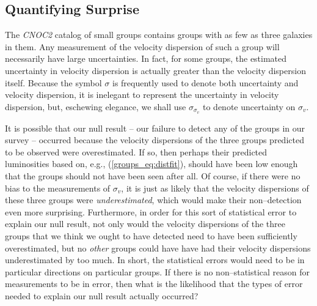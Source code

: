 \subsection{Quantifying Surprise}
\label{groups_subsec:surprise}
The \textsl{CNOC2} catalog of small groups \citep{carlberg2001gg}
contains groups with as few as three galaxies in them.  Any
measurement of the velocity dispersion of such a group will
necessarily have large uncertainties.  In fact, for some groups, the
estimated uncertainty in velocity dispersion is actually greater than
the velocity dispersion itself.  Because the symbol $\sigma$ is
frequently used to denote both uncertainty and velocity dispersion, it
is inelegant to represent the uncertainty in velocity dispersion, but,
eschewing elegance, we shall use $\sigma_{\sigma_v}$ to denote
uncertainty on $\sigma_v$.

It is possible that our null result -- our failure to detect any of
the groups in our survey -- occurred because the velocity dispersions
of the three groups predicted to be observed were overestimated.  If
so, then perhaps their predicted luminosities based on, e.g.,
(\ref{groups_eq:distfit}), should have been low enough that the groups
should not have been seen after all.  Of course, if there were no bias
to the measurements of $\sigma_v$, it is just as likely that the
velocity dispersions of these three groups were {\it underestimated},
which would make their non--detection even more surprising.
Furthermore, in order for this sort of statistical error to explain
our null result, not only would the velocity dispersions of the three
groups that we think we ought to have detected need to have been
sufficiently overestimated, but no {\it other} groups could have have
had their velocity dispersions underestimated by too much.  In short,
the statistical errors would need to be in particular directions on
particular groups.  If there is no non--statistical reason for
measurements to be in error, then what is the likelihood that the
types of error needed to explain our null result actually occurred?

